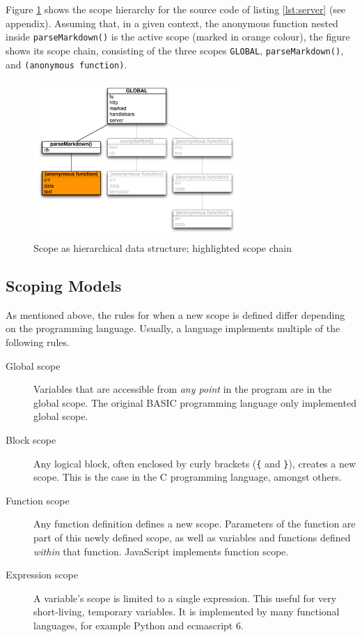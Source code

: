 Figure \ref{fig:scopechain} shows the scope hierarchy for the source
code of listing \ref{lst:server} (see appendix). Assuming that, in a
given context, the anonymous function nested inside
\texttt{parseMarkdown()} is the active scope (marked in orange colour),
the figure shows its scope chain, consisting of the three scopes
\texttt{GLOBAL}, \texttt{parseMarkdown()}, and
\texttt{(anonymous function)}.

\begin{figure}[htbp]
\centering
\includegraphics[keepaspectratio,width=0.7\textwidth]{img/scopechain.pdf}
\caption{Scope as hierarchical data structure; highlighted scope chain}
\label{fig:scopechain}
\end{figure}

\subsection{Scoping Models}\label{scoping-models}

As mentioned above, the rules for when a new scope is defined differ
depending on the programming language. Usually, a language implements
multiple of the following rules.

\begin{description}
\item[Global scope]
Variables that are accessible from \emph{any point} in the program are
in the global scope. The original BASIC programming language only
implemented global scope.
\item[Block scope]
Any logical block, often enclosed by curly brackets (\texttt{\{} and
\texttt{\}}), creates a new scope. This is the case in the C programming
language, amongst others.
\item[Function scope]
Any function definition defines a new scope. Parameters of the function
are part of this newly defined scope, as well as variables and functions
defined \emph{within} that function. JavaScript implements function
scope.
\item[Expression scope]
A variable’s scope is limited to a single expression. This useful for
very short-living, temporary variables. It is implemented by many
functional languages, for example Python and \gls{ecmascript} 6.
\end{description}

